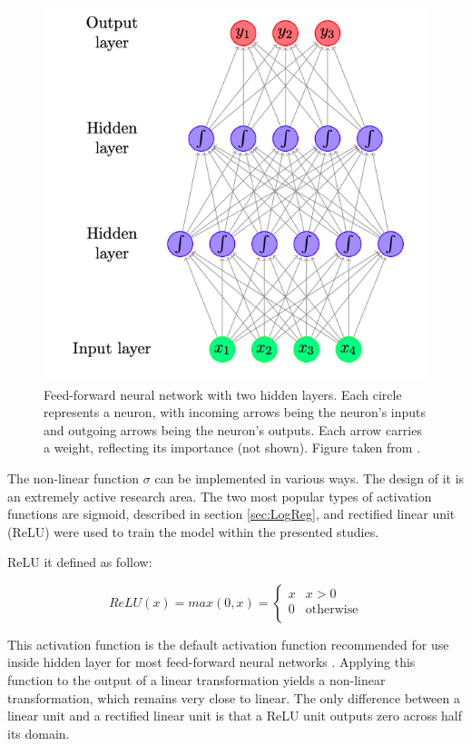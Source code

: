 \begin{figure}[!ht]
\centering
\includegraphics[scale=0.7]{figures/NN.png}
\caption{ Feed-forward neural network with two hidden layers.  Each circle represents a neuron, with incoming arrows being the neuron’s inputs and outgoing arrows being the neuron’s outputs. Each arrow carries a weight, reflecting its importance (not shown). Figure taken from \cite{text_processing}.
}
\label{fig:NN}
\end{figure} 
 
 
The non-linear function $\sigma$ can be implemented in various ways. The design of it is an extremely active research area. The two most popular types of activation functions are sigmoid, described in section \ref{sec:LogReg}, and rectified linear unit (ReLU)  were used to train the model within the presented studies.  

ReLU \cite{relu} it defined as follow: 

\begin{equation}
ReLU(x) = max(0,x)= \left\{ \begin{array}{ll}
x & x>0\\
0 & \textrm{otherwise}\\
\end{array} \right.
\end{equation}

This activation function is the default activation function recommended for use inside hidden layer for most feed-forward neural networks \cite{DLBook}. Applying this function to the output of a linear transformation yields a non-linear transformation, which remains very close to linear. The only diﬀerence between a linear unit and a rectiﬁed linear unit is that a ReLU unit outputs zero across half its domain. 

